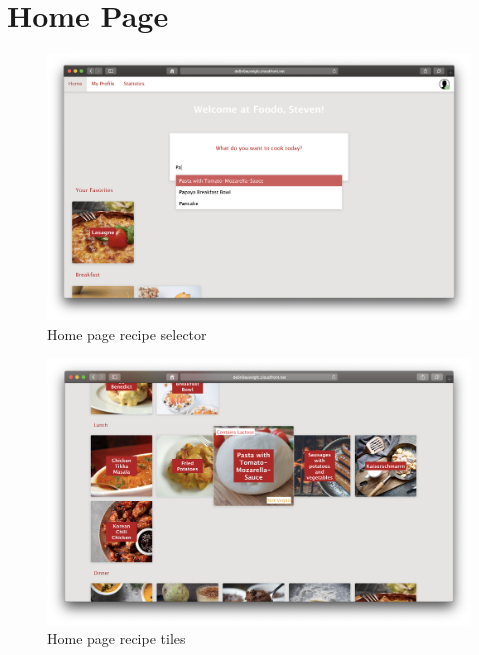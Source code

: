 \section*{Home Page}
\vspace{-2em}
\begin{figure}[H]
	\captionsetup{justification=centering}
	\begin{center}
		\includegraphics[scale=0.30]{Ressourcen/img/screenshots/screenshotF.png}
		\vspace{-3em}
		\caption{Home page recipe selector }
	\end{center}
\end{figure}
\vspace{-2em}
\begin{figure}[H]
	\captionsetup{justification=centering}
	\begin{center}
		\includegraphics[scale=0.30]{Ressourcen/img/screenshots/screenshotG.png}
		\vspace{-3em}
		\caption{Home page recipe tiles}
	\end{center}
\end{figure}

